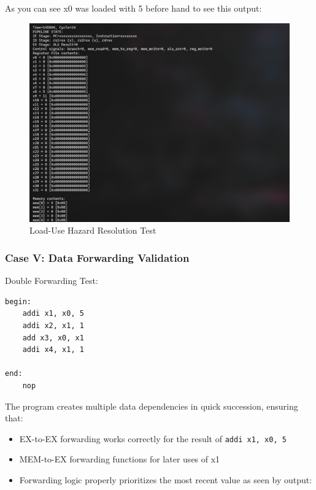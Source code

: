 \documentclass{article}
\numberwithin{figure}{section}
\numberwithin{table}{section}
\begin{document}
As you can see x0 was loaded with 5 before hand to see this output:
\begin{figure}[H]
    \centering
    \includegraphics[width=0.95\linewidth]{pipe_test8.png}
    \caption{Load-Use Hazard Resolution Test}
    \label{fig:pipe-test8}
\end{figure}

\subsubsection{Case V: Data Forwarding Validation}

Double Forwarding Test:

\begin{lstlisting}[style=verilog-style]
begin:  
    addi x1, x0, 5
    addi x2, x1, 1
    add x3, x0, x1
    addi x4, x1, 1 

end:
    nop
\end{lstlisting}

The program creates multiple data dependencies in quick succession, ensuring that:
\begin{itemize}
    \item EX-to-EX forwarding works correctly for the result of \texttt{addi x1, x0, 5}
    \item MEM-to-EX forwarding functions for later uses of x1
    \item Forwarding logic properly prioritizes the most recent value as seen by output:
\end{itemize}
\end{document}
